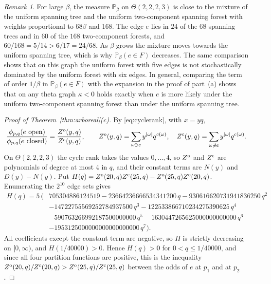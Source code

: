 \documentclass[11pt]{amsart}
\theoremstyle{remark}
\newtheorem{remark}[theorem]{Remark}
\numberwithin{equation}{section}
\newcommand{\Pp}{\mathbb P}
\newcommand{\open}{\ \textup{open}}
\begin{document}
\begin{remark}\label{rem:layers}
For large $\beta$, the measure $\Pp_\beta$ on $\Theta(2,2,2,3)$ is close to the mixture of the uniform spanning tree and the uniform two-component spanning forest with weights proportional to $68\beta$ and $168$. The edge $e$ lies in $24$ of the $68$ spanning trees and in $60$ of the $168$ two-component forests, and $60/168=5/14>6/17=24/68$. As $\beta$ grows the mixture moves towards the uniform spanning tree, which is why $\Pp_\beta(e\in F)$ decreases. The same comparison shows that on this graph the uniform forest with five edges is not stochastically dominated by the uniform forest with six edges. In general, comparing the term of order $1/\beta$ in $\Pp_\beta(e\in F)$ with the expansion in the proof of part~(a) shows that on any theta graph $\kappa<0$ holds exactly when $e$ is more likely under the uniform two-component spanning forest than under the uniform spanning tree.
\end{remark}

\begin{proof}[Proof of Theorem~\ref{thm:arboreal}\textup{(c)}]
By \eqref{eq:cyclerank}, with $x=yq$,
\[
 \frac{\phi_{p,q}(e\open)}{\phi_{p,q}(e\ \textup{closed})}=\frac{Z^{\rm o}(y,q)}{Z^{\rm c}(y,q)},\qquad Z^{\rm o}(y,q)=\sum_{\omega\ni e}y^{|\omega|}q^{c(\omega)},\quad Z^{\rm c}(y,q)=\sum_{\omega\not\ni e}y^{|\omega|}q^{c(\omega)}.
\]
On $\Theta(2,2,2,3)$ the cycle rank takes the values $0,\dots,4$, so $Z^{\rm o}$ and $Z^{\rm c}$ are polynomials of degree at most $4$ in $q$, and their constant terms are $N(y)$ and $D(y)-N(y)$. Put $H(q)=Z^{\rm o}(20,q)Z^{\rm c}(25,q)-Z^{\rm o}(25,q)Z^{\rm c}(20,q)$. Enumerating the $2^{10}$ edge sets gives
\begin{align*}
 H(q)=5\,\bigl(&705304886124519-23664236666534341200\,q-930616620731941836250\,q^2\\
 &-14722755569252784937500\,q^3-122533866710234275390625\,q^4\\
 &-590763266992187500000000\,q^5-1630447265625000000000000\,q^6\\
 &-1953125000000000000000000\,q^7\bigr).
\end{align*}
All coefficients except the constant term are negative, so $H$ is strictly decreasing on $[0,\infty)$, and $H(1/40000)>0$. Hence $H(q)>0$ for $0<q\le1/40000$, and since all four partition functions are positive, this is the inequality $Z^{\rm o}(20,q)/Z^{\rm c}(20,q)>Z^{\rm o}(25,q)/Z^{\rm c}(25,q)$ between the odds of $e$ at $p_1$ and at $p_2$.
\end{proof}
\end{document}
